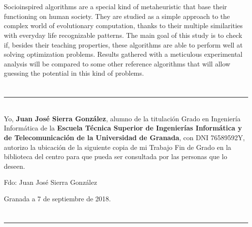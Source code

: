 \\

\vspace{0.7cm}
\\

Socioinspired algorithms are a special kind of metaheuristic that base their functioning on human society. They are studied as a simple approach to the complex world of evolutionary computation, thanks to their multiple similarities with everyday life recognizable patterns. The main goal of this study is to check if, besides their teaching properties, these algorithms are able to perform well at solving optimization problems. Results gathered with a meticulous experimental analysis will be compared to some other reference algorithms that will allow guessing the potential in this kind of problems.

\chapter*{}
\thispagestyle{empty}

\noindent\rule[-1ex]{\textwidth}{2pt}\\[4.5ex]

Yo, \textbf{Juan José Sierra González}, alumno de la titulación Grado en Ingeniería Informática de la \textbf{Escuela Técnica Superior
de Ingenierías Informática y de Telecomunicación de la Universidad de Granada}, con DNI 76589592Y, autorizo la
ubicación de la siguiente copia de mi Trabajo Fin de Grado en la biblioteca del centro para que pueda ser
consultada por las personas que lo deseen.

\vspace{6cm}

\noindent Fdo: Juan José Sierra González

\vspace{2cm}

\begin{flushright}
Granada a 7 de septiembre de 2018.
\end{flushright}


\chapter*{}
\thispagestyle{empty}

\noindent\rule[-1ex]{\textwidth}{2pt}\\[4.5ex]

